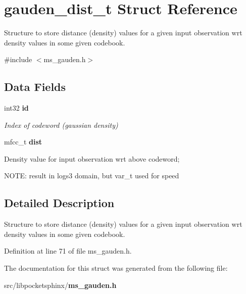 \section{gauden\-\_\-dist\-\_\-t Struct Reference}
\label{structgauden__dist__t}


Structure to store distance (density) values for a given input observation wrt density values in some given codebook.  




{\ttfamily \#include $<$ms\-\_\-gauden.\-h$>$}

\subsection*{Data Fields}
\begin{DoxyCompactItemize}
\item 
int32 {\bf id}\label{structgauden__dist__t_a93e978149bae5b5bf089769458c42ee4}

\begin{DoxyCompactList}\small\item\em Index of codeword (gaussian density) \end{DoxyCompactList}\item 
mfcc\-\_\-t {\bf dist}\label{structgauden__dist__t_ab08100d4953998dad76bfcf30864c0c5}

\begin{DoxyCompactList}\small\item\em \begin{DoxyVerb}      Density value for input observation wrt above codeword;
\end{DoxyVerb}
 N\-O\-T\-E\-: result in logs3 domain, but var\-\_\-t used for speed \end{DoxyCompactList}\end{DoxyCompactItemize}


\subsection{Detailed Description}
Structure to store distance (density) values for a given input observation wrt density values in some given codebook. 

Definition at line 71 of file ms\-\_\-gauden.\-h.



The documentation for this struct was generated from the following file\-:\begin{DoxyCompactItemize}
\item 
src/libpocketsphinx/{\bf ms\-\_\-gauden.\-h}\end{DoxyCompactItemize}
